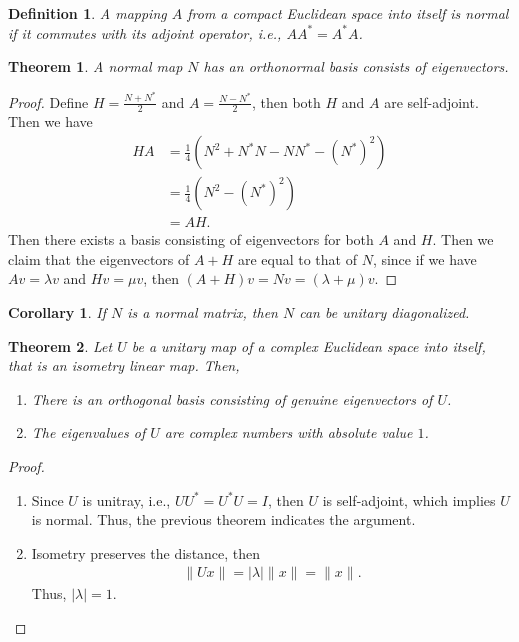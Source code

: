 \documentclass[11pt]{book}
\newtheorem{definition}{Definition}[section]
\newtheorem{theorem}{Theorem}[section]
\newtheorem{corollary}{Corollary}[section]
\theoremstyle{definition}
\numberwithin{equation}{subsection}
\begin{document}
\medskip

\begin{definition}
A mapping $A$ from a compact Euclidean space into itself is normal if it commutes with its adjoint operator, i.e., $AA^* = A^* A$.
\end{definition}

\medskip

\begin{theorem}
A normal map $N$ has an orthonormal basis consists of eigenvectors.
\end{theorem}
\begin{proof}
Define $H = \frac{N+N^*}{2}$ and $A = \frac{N-N^*}{2}$, then both $H$ and $A$ are self-adjoint. Then we have
\begin{align*}
    HA & = \frac{1}{4}\left(N^2 + N^*N - NN^* - \left(N^*\right)^2 \right) \\
    & = \frac{1}{4}\left(N^2 - \left(N^*\right)^2 \right)\\
    & = AH.
\end{align*}
Then there exists a basis consisting of eigenvectors for both $A$ and $H$. Then we claim that the eigenvectors of $A+H$ are equal to that of $N$, since if we have $Av = \lambda v$ and $Hv = \mu v$, then $(A+H)v = N v = (\lambda + \mu)v$.
\end{proof}

\medskip

\begin{corollary}
If $N$ is a normal matrix, then $N$ can be unitary diagonalized.
\end{corollary}

\medskip

\begin{theorem}
Let $U$ be a unitary map of a complex Euclidean space into itself, that is an isometry linear map. Then,
\begin{enumerate}[label=(\roman*)]
    \item There is an orthogonal basis consisting of genuine eigenvectors of $U$.
    \item The eigenvalues of $U$ are complex numbers with absolute value $1$.
\end{enumerate}
\end{theorem}
\begin{proof}
~\begin{enumerate}[label=(\roman*)]
    \item Since $U$ is unitray, i.e., $UU^* = U^*U = I$, then $U$ is self-adjoint, which implies $U$ is normal. Thus,  the previous theorem indicates the argument.
    \item Isometry preserves the distance, then 
    \begin{align*}
        \|Ux\| = |\lambda| \|x\| = \|x\|.
    \end{align*}
    Thus, $|\lambda| = 1$.
\end{enumerate}
\end{proof}
\end{document}
